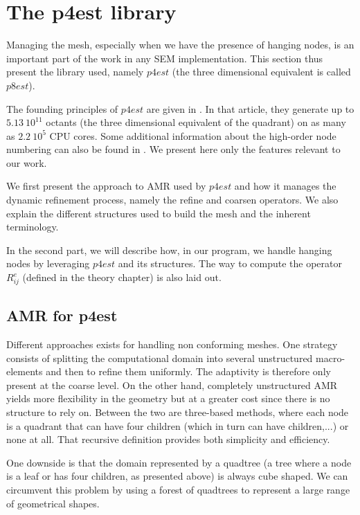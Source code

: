 \section{The p4est library}

Managing the mesh, especially when we have the presence of hanging nodes, is an important part of the work in any SEM implementation. This section thus present the library used, namely $p4est$ (the three dimensional equivalent is called $p8est$). 

The founding principles of $p4est$ are given in \cite{p4est}. In that article, they generate up to $5.13\: 10^{11}$ octants (the three dimensional equivalent of the quadrant) on as many as $2.2 \: 10^{5}$ CPU cores. Some additional information about the high-order node numbering can also be found in \cite{p4est2}. We present here only the features relevant to our work. 

We first present the approach to AMR used by $p4est$ and how it manages the dynamic refinement process, namely the refine and coarsen operators. We also explain the different structures used to build the mesh and the inherent terminology. 

In the second part, we will describe how, in our program, we handle hanging nodes by leveraging $p4est$ and its structures. The way to compute the operator $R_{ij}^e$ (defined in the theory chapter) is also laid out. 

\subsection{AMR for p4est}

Different approaches exists for handling non conforming meshes. One strategy consists of splitting the computational domain into several unstructured macro-elements and then to refine them uniformly. The adaptivity is therefore only present at the coarse level. On the other hand, completely unstructured AMR yields more flexibility in the geometry but at a greater cost since there is no structure to rely on. Between the two are three-based methods, where each node is a quadrant that can have four children (which in turn can have children,...) or none at all. That recursive definition provides both simplicity and efficiency.

One downside is that the domain represented by a quadtree (a tree where a node is a leaf or has four children, as presented above) is always cube shaped. We can circumvent this problem by using a forest of quadtrees to represent a large range of geometrical shapes. 

